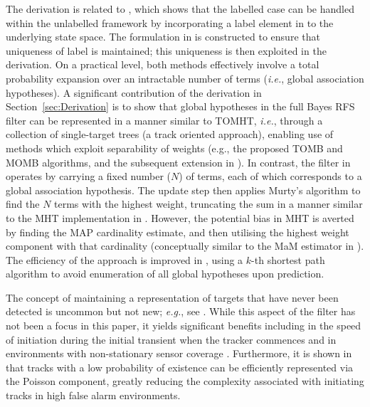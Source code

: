 \documentclass[journal,twoside]{IEEEtran}
\theoremstyle{plain}
\begin{document}
The derivation is related to \cite{VoVo13}, which shows that the labelled case can be handled within the unlabelled framework by incorporating a label element in to the underlying state space. The formulation in \cite{VoVo13} is constructed to ensure that uniqueness of label is maintained; this uniqueness is then exploited in the derivation. On a practical level, both methods effectively involve a total probability expansion over an intractable number of terms (\textit{i.e.}\xspace, global association hypotheses). A significant contribution of the derivation in Section~\ref{sec:Derivation} is to show that global hypotheses in the full Bayes RFS filter can be represented in a manner similar to TOMHT, \textit{i.e.}\xspace, through a collection of single-target trees (a track oriented approach), enabling use of methods which exploit separability of weights (e.g., the proposed TOMB and MOMB algorithms, and the subsequent extension in \cite{Wil14}). In contrast, the filter in \cite{VoVo13} operates by carrying a fixed number ($N$) of terms, each of which corresponds to a global association hypothesis. The update step then applies Murty's algorithm to find the $N$ terms with the highest weight, truncating the sum in a manner similar to the MHT implementation in \cite{Cox96}. However, the potential bias in MHT is averted by finding the MAP cardinality estimate, and then utilising the highest weight component with that cardinality (conceptually similar to the MaM estimator in \cite[p497]{Mah07}). The efficiency of the approach is improved in \cite{VoVo14}, using a $k$-th shortest path algorithm to avoid enumeration of all global hypotheses upon prediction.

The concept of maintaining a representation of targets that have never been detected is uncommon but not new; \textit{e.g.}\xspace, see \cite{MorCho86}. While this aspect of the filter has not been a focus in this paper, it yields significant benefits including in the speed of initiation during the initial transient when the tracker commences and in environments with non-stationary sensor coverage \cite{Wil12F2}. Furthermore, it is shown in \cite{Wil12F2} that tracks with a low probability of existence can be efficiently represented via the Poisson component, greatly reducing the complexity associated with initiating tracks in high false alarm environments. 
\end{document}
